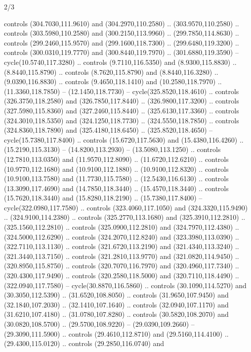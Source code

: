 \begin{flagdescription}{2/3}
\begin{scope}[xshift=0.5\flaglength,yshift=0.5\flagwidth,scale=\stretchfactor]
\begin{scope}[scale=0.001645\flagwidth,yshift=65mm,xshift=-63mm]
\begin{scope}[y=0.80pt, x=0.80pt, yscale=-1,]
\begin{scope}[cm={{1.33333,0.0,0.0,1.33333,(0.0,1e-05)}}]
  controls (304.7030,111.9610) and (304.2970,110.2580) .. (303.9570,110.2580) ..
  controls (303.5980,110.2580) and (300.2150,113.9960) .. (299.7850,114.8630) ..
  controls (299.2460,115.9570) and (299.1600,118.7300) .. (299.6480,119.3200) ..
  controls (300.0310,119.7770) and (300.8440,119.7970) .. (301.6880,119.3590) --
  cycle(10.5740,117.3280) .. controls (9.7110,116.5350) and (8.9300,115.8830) ..
  (8.8440,115.8790) .. controls (8.7620,115.8790) and (8.8440,116.3280) ..
  (9.0390,116.8830) .. controls (9.4650,118.1410) and (10.2580,118.7970) ..
  (11.3360,118.7850) -- (12.1450,118.7730) -- cycle(325.8520,118.4610) ..
  controls (326.3750,118.2580) and (326.7850,117.8440) .. (326.9800,117.3200) ..
  controls (327.5980,115.8360) and (327.2460,115.8440) .. (325.6130,117.3360) ..
  controls (324.3010,118.5350) and (324.1250,118.7730) .. (324.5550,118.7850) ..
  controls (324.8360,118.7890) and (325.4180,118.6450) .. (325.8520,118.4650) --
  cycle(15.7380,117.8400) .. controls (15.6720,117.5630) and (15.4380,116.4260)
  .. (15.2190,115.3130) -- (14.8200,113.2930) -- (13.5080,113.1250) .. controls
  (12.7810,113.0350) and (11.9570,112.8090) .. (11.6720,112.6210) .. controls
  (10.9770,112.1680) and (10.9100,112.1880) .. (10.9100,112.8320) .. controls
  (10.9100,113.7580) and (11.7730,115.7580) .. (12.5430,116.6130) .. controls
  (13.3090,117.4690) and (14.7850,118.3440) .. (15.4570,118.3440) .. controls
  (15.7620,118.3440) and (15.8280,118.2190) .. (15.7380,117.8400) --
  cycle(322.0980,117.7580) .. controls (323.4060,117.1050) and
  (324.3320,115.9490) .. (324.9100,114.2380) .. controls (325.2770,113.1680) and
  (325.3910,112.2810) .. (325.1560,112.2810) .. controls (325.0900,112.2810) and
  (324.7970,112.4380) .. (324.5000,112.6290) .. controls (324.2070,112.8240) and
  (323.3980,113.0390) .. (322.7110,113.1130) .. controls (321.6720,113.2190) and
  (321.4340,113.3240) .. (321.3440,113.7150) .. controls (321.2810,113.9770) and
  (321.0820,114.9450) .. (320.8950,115.8750) .. controls (320.7070,116.7970) and
  (320.4960,117.7340) .. (320.4300,117.9490) .. controls (320.2580,118.5000) and
  (320.7110,118.4490) .. (322.0940,117.7580) -- cycle(30.8870,116.5860) ..
  controls (30.1090,114.5270) and (30.3050,112.5390) .. (31.6520,108.8050) ..
  controls (31.9650,107.9450) and (32.1840,107.2030) .. (32.1410,107.1640) ..
  controls (32.0940,107.1170) and (31.6210,107.4180) .. (31.0780,107.8280) ..
  controls (30.5820,108.2070) and (30.0820,108.5700) .. (29.5700,108.9220) --
  (29.0390,109.2660) -- (29.3090,111.5900) .. controls (29.4610,112.8710) and
  (29.5160,114.4100) .. (29.4300,115.0120) .. controls (29.2850,116.0740) and

\end{scope}
\end{scope}
\end{scope}
\end{scope}
\end{flagdescription}
